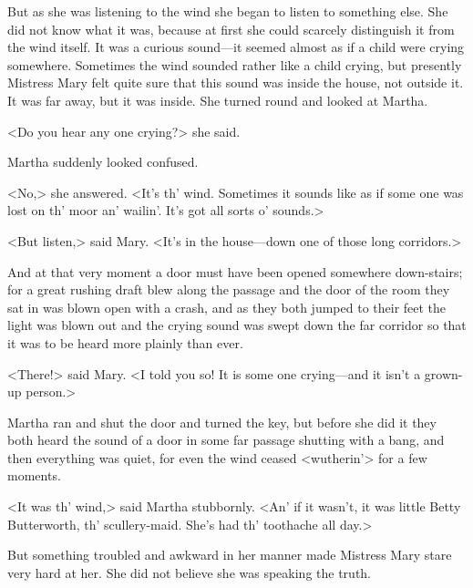 But as she was listening to the wind she began to listen to something else. She did not know what it was, because at first she could scarcely distinguish it from the wind itself. It was a curious sound—it seemed almost as if a child were crying somewhere. Sometimes the wind sounded rather like a child crying, but presently Mistress Mary felt quite sure that this sound was inside the house, not outside it. It was far away, but it was inside. She turned round and looked at Martha.

<Do you hear any one crying?> she said.

Martha suddenly looked confused.

<No,> she answered. <It's th' wind. Sometimes it sounds like as if some one was lost on th' moor an' wailin'. It's got all sorts o' sounds.>

<But listen,> said Mary. <It's in the house—down one of those long corridors.>

And at that very moment a door must have been opened somewhere down-stairs; for a great rushing draft blew along the passage and the door of the room they sat in was blown open with a crash, and as they both jumped to their feet the light was blown out and the crying sound was swept down the far corridor so that it was to be heard more plainly than ever.

<There!> said Mary. <I told you so! It is some one crying—and it isn't a grown-up person.>

Martha ran and shut the door and turned the key, but before she did it they both heard the sound of a door in some far passage shutting with a bang, and then everything was quiet, for even the wind ceased <wutherin'> for a few moments.

<It was th' wind,> said Martha stubbornly. <An' if it wasn't, it was little Betty Butterworth, th' scullery-maid. She's had th' toothache all day.>

But something troubled and awkward in her manner made Mistress Mary stare very hard at her. She did not believe she was speaking the truth.